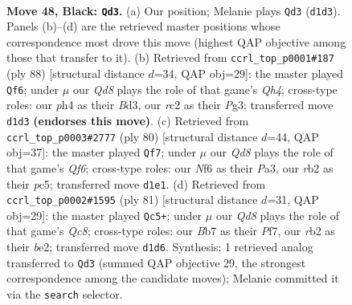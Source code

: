 \documentclass[11pt]{article}
\begin{document}
\clearpage

\begin{figure}[p]\centering
\begin{subfigure}{0.46\textwidth}\centering
\resizebox{\linewidth}{!}{%
\newchessgame
\chessboard[
  setfen={6k1/1b3p2/5np1/8/7P/8/1RR4P/3q1NK1 b - - 4 48},
  showmover=false,
  pgfstyle=straightmove, color=movearrow, markmove={d1-d3}
]}
\caption{}
\end{subfigure}\hfill
\begin{subfigure}{0.46\textwidth}\centering
\resizebox{\linewidth}{!}{%
\newchessgame
\chessboard[
  setfen={3k4/2p1r3/2p5/4r2p/7Q/3B2P1/5K2/8 w - - 0 45},
  showmover=false,
  pgfstyle=straightmove, color=movearrow, markmove={h4-f6}
]}
\caption{}
\end{subfigure}
\\[4pt]
\begin{subfigure}{0.46\textwidth}\centering
\resizebox{\linewidth}{!}{%
\newchessgame
\chessboard[
  setfen={8/1p6/1kn2Q2/2p5/3r2p1/P7/1P4P1/1K6 w - - 5 41},
  showmover=false,
  pgfstyle=straightmove, color=movearrow, markmove={f6-f7}
]}
\caption{}
\end{subfigure}\hfill
\begin{subfigure}{0.46\textwidth}\centering
\resizebox{\linewidth}{!}{%
\newchessgame
\chessboard[
  setfen={6k1/5p2/7p/5n2/5P2/8/R3B1PP/2q2RK1 b - - 3 41},
  showmover=false,
  pgfstyle=straightmove, color=movearrow, markmove={c1-c5}
]}
\caption{}
\end{subfigure}
\caption{\textbf{Move 48, Black: \texttt{Qd3}.} (a) Our position; Melanie plays \texttt{Qd3} (\texttt{d1d3}). Panels (b)--(d) are the retrieved master positions whose correspondence most drove this move (highest QAP objective among those that transfer to it). (b) Retrieved from \texttt{ccrl\_top\_p0001\#187} (ply 88) [structural distance $d$=34, QAP obj=29]: the master played \texttt{Qf6}; under $\mu$ our \emph{Qd8} plays the role of that game's \emph{Qh4}; cross-type roles: our \emph{p}h4 as their \emph{B}d3, our \emph{r}c2 as their \emph{P}g3; transferred move \texttt{d1d3} \textbf{(endorses this move)}. (c) Retrieved from \texttt{ccrl\_top\_p0003\#2777} (ply 80) [structural distance $d$=44, QAP obj=37]: the master played \texttt{Qf7}; under $\mu$ our \emph{Qd8} plays the role of that game's \emph{Qf6}; cross-type roles: our \emph{N}f6 as their \emph{P}a3, our \emph{r}b2 as their \emph{p}c5; transferred move \texttt{d1e1}. (d) Retrieved from \texttt{ccrl\_top\_p0002\#1595} (ply 81) [structural distance $d$=31, QAP obj=29]: the master played \texttt{Qc5+}; under $\mu$ our \emph{Qd8} plays the role of that game's \emph{Qc8}; cross-type roles: our \emph{B}b7 as their \emph{P}f7, our \emph{r}b2 as their \emph{b}e2; transferred move \texttt{d1d6}. Synthesis: 1 retrieved analog transferred to \texttt{Qd3} (summed QAP objective 29, the strongest correspondence among the candidate moves); Melanie committed it via the \texttt{search} selector.}
\label{fig:thought-m95}
\end{figure}
\end{document}
